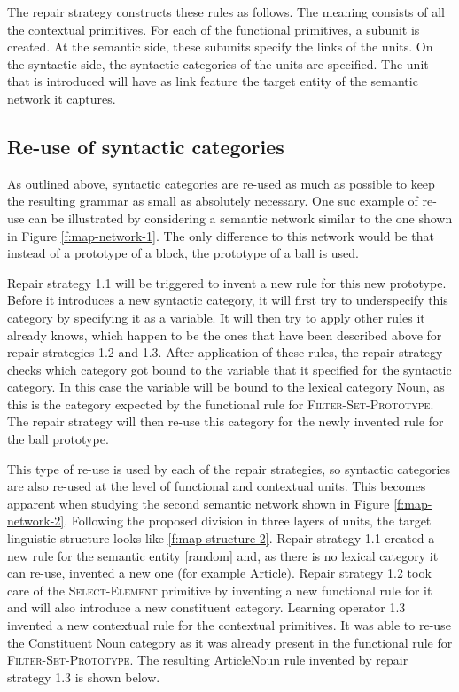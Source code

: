 The repair strategy constructs these rules as follows. The meaning
consists of all the contextual primitives. For each of the functional
primitives, a subunit is created. At the semantic side, these subunits
specify the links of the units. On the syntactic side, the syntactic
categories of the units are specified. The unit that is introduced will
have as link feature the target entity of the semantic network it
captures.

\subsection{Re-use of syntactic categories}

As outlined above, syntactic categories are re-used as much as
possible to keep the resulting grammar as small as absolutely
necessary. One suc example of re-use can be illustrated by considering
a semantic network similar to the one shown in Figure
\ref{f:map-network-1}. The only difference to this network would be
that instead of a prototype of a block, the prototype of a ball is
used.

Repair strategy 1.1 will be triggered to invent a new rule for
this new prototype. Before it introduces a new syntactic category, it
will first try to underspecify this category by specifying it as a
variable. It will then try to apply other rules it already knows,
which happen to be the ones that have been described above for
repair strategies 1.2 and 1.3. After application of these rules, the
repair strategy checks which category got bound to the variable that
it specified for the syntactic category. In this case the variable
will be bound to the lexical category Noun, as this is the category
expected by the functional rule for \textsc{Filter-Set-Prototype}. The
repair strategy will then re-use this category for the newly
invented rule for the ball prototype.

This type of re-use is used by each of the repair strategies, so
syntactic categories are also re-used at the level of functional and
contextual units. This becomes apparent when studying the second
semantic network shown in Figure \ref{f:map-network-2}. Following the
proposed division in three layers of units, the target linguistic
structure looks like \ref{f:map-structure-2}. Repair strategy 1.1
created a new rule for the semantic entity [random] and, as there is
no lexical category it can re-use, invented a new one (for example
Article). Repair strategy 1.2 took care of the
\textsc{Select-Element} primitive by inventing a new functional rule
for it and will also introduce a new constituent category. Learning
operator 1.3 invented a new contextual rule for the contextual
primitives. It was able to re-use the Constituent Noun category as it
was already present in the functional rule for
\textsc{Filter-Set-Prototype}. The resulting ArticleNoun rule invented
by repair strategy 1.3 is shown below.

